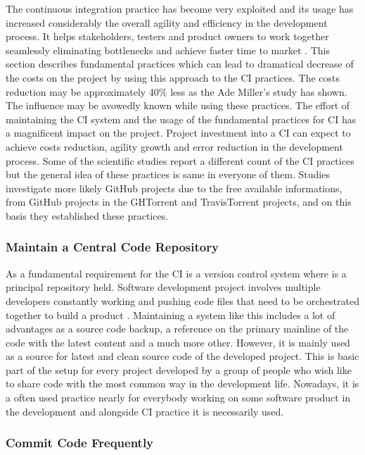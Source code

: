 The continuous integration practice has become very exploited and its usage has increased considerably the overall agility and efficiency in the development process. It helps stakeholders, testers and product owners to work together seamlessly eliminating bottlenecks and achieve faster time to market \cite{CI-BP1}. This section describes fundamental practices which can lead to dramatical decrease of the costs on the project by using this approach to the CI practices. The costs reduction may be approximately 40\% less as the Ade Miller's study \cite{100DaysOfCI} has shown. The influence may be avowedly known while using these practices. The effort of maintaining the CI system and the usage of the fundamental practices for CI has a magnificent impact on the project. Project investment into a CI can expect to achieve costs reduction, agility growth and error reduction in the development process. Some of the scientific studies report a different count of the CI practices but the general idea of these practices is same in everyone of them. Studies investigate more likely GitHub projects due to the free available informations, from GitHub projects in the GHTorrent and TravisTorrent projects, and on this basis they established these practices.

\subsubsection{Maintain a Central Code Repository}

As a fundamental requirement for the CI is a version control system where is a principal repository held. Software development project involves multiple developers constantly working and pushing code files that need to be orchestrated together to build a product \cite{CI-BP1}. Maintaining a system like this includes a lot of advantages as a source code backup, a reference on the primary mainline of the code with the latest content and a much more other. However, it is mainly used as a source for latest and clean source code of the developed project. This is basic part of the setup for every project developed by a group of people who wish like to share code with the most common way in the development life. Nowadays, it is a often used practice nearly for everybody working on some software product in the development and alongside CI practice it is necessarily used.

\subsubsection{Commit Code Frequently}

